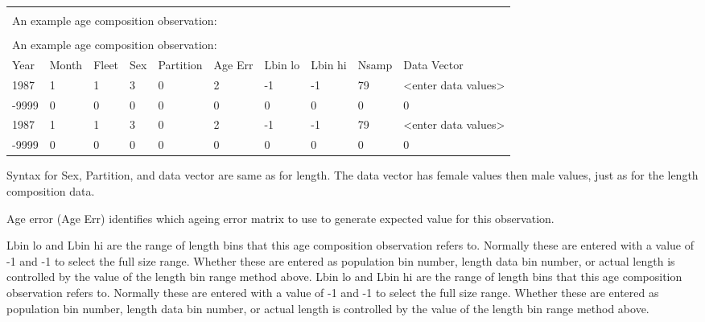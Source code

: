 \begin{tabular}{p{1cm} p{1cm} p{1cm} p{1cm} p{1.5cm} p{1cm} p{1cm} p{1cm} p{1cm} p{2.1cm}}
	\multicolumn{10}{l}{} \\
	\multicolumn{10}{l}{An example age composition observation:} \\
	\multicolumn{10}{l}{} \\
	\multicolumn{10}{l}{An example age composition observation:} \\
	\hline
	Year & Month & Fleet & Sex & Partition & Age Err & Lbin lo & Lbin hi & Nsamp & Data Vector \Tstrut\\
	\hline
	1987 & 1 & 1 & 3 & 0 & 2 & -1 & -1 & 79 & <enter data values> \Tstrut\\
	-9999 & 0 & 0 & 0 & 0 & 0 & 0 & 0 & 0 & 0 \Bstrut\\
	1987 & 1 & 1 & 3 & 0 & 2 & -1 & -1 & 79 & <enter data values> \Tstrut\\
	-9999 & 0 & 0 & 0 & 0 & 0 & 0 & 0 & 0 & 0 \Bstrut\\
	\hline
\end{tabular}

Syntax for Sex, Partition, and data vector are same as for length. The data vector has female values then male values, just as for the length composition data.


Age error (Age Err) identifies which ageing error matrix to use to generate expected value for this observation.

Lbin lo and Lbin hi are the range of length bins that this age composition observation refers to. Normally these are entered with a value of -1 and -1 to select the full size range. Whether these are entered as population bin number, length data bin number, or actual length is controlled by the value of the length bin range method above.
Lbin lo and Lbin hi are the range of length bins that this age composition observation refers to. Normally these are entered with a value of -1 and -1 to select the full size range. Whether these are entered as population bin number, length data bin number, or actual length is controlled by the value of the length bin range method above.

